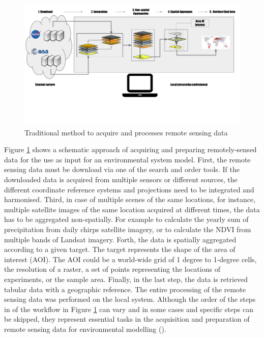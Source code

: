 \begin{center}
	\begin{figure}[h]
		\begin{center}
			\includegraphics[width=15cm]{images/traditional_acquisition.pdf}
			\caption{Traditional method to acquire and processes remote sensing data}
			\label{traditionl_approach}
		\end{center}
	\end{figure}
\end{center}


Figure \ref{traditionl_approach} shows a schematic approach of acquiring and preparing remotely-sensed data for the use as input for an environmental system model.
First, the remote sensing data must be download via one of the search and order tools. If the downloaded data is acquired from multiple sensors or different sources, the different coordinate reference systems and projections need to be integrated and harmonised. Third, in case of multiple scenes of the same locations, for instance, multiple satellite images of the same location acquired at different times, the data has to be aggregated non-spatially. For example to calculate the yearly sum of precipitation from daily chirps satellite imagery, or to calculate the NDVI from multiple bands of Landsat imagery.
Forth, the data is spatially aggregated according to a given target. The target represents the shape of the area of interest (AOI). The AOI could be a world-wide grid of 1 degree to 1-degree cells, the resolution of a raster, a set of points representing the locations of experiments, or the sample area. Finally, in the last step, the data is retrieved tabular data with a geographic reference. The entire processing of the remote sensing data was performed on the local system.
Although the order of the steps in of the workflow in Figure \ref{traditionl_approach} can vary and in some cases and specific steps can be skipped, they represent essential tasks in the acquisition and preparation of remote sensing data for environmental modelling (\cite{iosifescu2011geovite}).

